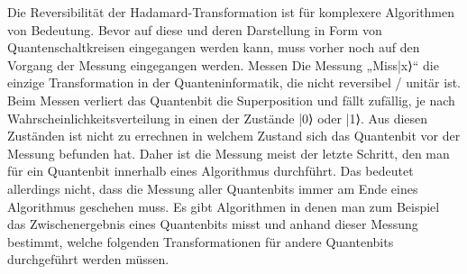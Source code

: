 Die Reversibilität der Hadamard-Transformation ist für komplexere Algorithmen von Bedeutung. Bevor auf diese und deren Darstellung in Form von Quantenschaltkreisen eingegangen werden kann, muss vorher noch auf den Vorgang der Messung eingegangen werden.
Messen
Die Messung „Miss|x⟩“ die einzige Transformation in der Quanteninformatik, die nicht reversibel / unitär ist. Beim Messen verliert das Quantenbit die Superposition und fällt zufällig, je nach Wahrscheinlichkeitsverteilung in einen der Zustände |0⟩ oder |1⟩. Aus diesen Zuständen ist nicht zu errechnen in welchem Zustand sich das Quantenbit vor der Messung befunden hat. Daher ist die Messung meist der letzte Schritt, den man für ein Quantenbit innerhalb eines Algorithmus durchführt. Das bedeutet allerdings nicht, dass die Messung aller Quantenbits immer am Ende eines Algorithmus geschehen muss. Es gibt Algorithmen in denen man zum Beispiel das Zwischenergebnis eines Quantenbits misst und anhand dieser Messung bestimmt, welche folgenden Transformationen für andere Quantenbits durchgeführt werden müssen. 

